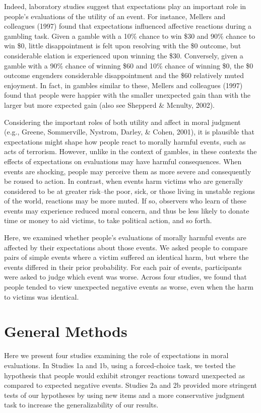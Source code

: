 \documentclass[10pt, letterpaper]{article}
\begin{document}
Indeed, laboratory studies suggest that expectations play an important
role in people's evaluations of the utility of an event. For instance,
Mellers and colleagues (1997) found that expectations influenced
affective reactions during a gambling task. Given a gamble with a 10\%
chance to win \$30 and 90\% chance to win \$0, little disappointment is
felt upon resolving with the \$0 outcome, but considerable elation is
experienced upon winning the \$30. Conversely, given a gamble with a
90\% chance of winning \$60 and 10\% chance of winning \$0, the \$0
outcome engenders considerable disappointment and the \$60 relatively
muted enjoyment. In fact, in gambles similar to these, Mellers and
colleagues (1997) found that people were happier with the smaller
unexpected gain than with the larger but more expected gain (also see
Shepperd \& Mcnulty, 2002).

Considering the important roles of both utility and affect in moral
judgment (e.g., Greene, Sommerville, Nystrom, Darley, \& Cohen, 2001),
it is plausible that expectations might shape how people react to
morally harmful events, such as acts of terrorism. However, unlike in
the context of gambles, in these contexts the effects of expectations on
evaluations may have harmful consequences. When events are shocking,
people may perceive them as more severe and consequently be roused to
action. In contrast, when events harm victims who are generally
considered to be at greater risk--the poor, sick, or those living in
unstable regions of the world, reactions may be more muted. If so,
observers who learn of these events may experience reduced moral
concern, and thus be less likely to donate time or money to aid victims,
to take political action, and so forth.

Here, we examined whether people's evaluations of morally harmful events
are affected by their expectations about those events. We asked people
to compare pairs of simple events where a victim suffered an identical
harm, but where the events differed in their prior probability. For each
pair of events, participants were asked to judge which event was worse.
Across four studies, we found that people tended to view unexpected
negative events as worse, even when the harm to victims was identical.

\section{General Methods}\label{general-methods}

Here we present four studies examining the role of expectations in moral
evaluations. In Studies 1a and 1b, using a forced-choice task, we tested
the hypothesis that people would exhibit stronger reactions toward
unexpected as compared to expected negative events. Studies 2a and 2b
provided more stringent tests of our hypotheses by using new items and a
more conservative judgment task to increase the generalizability of our
results.
\end{document}
